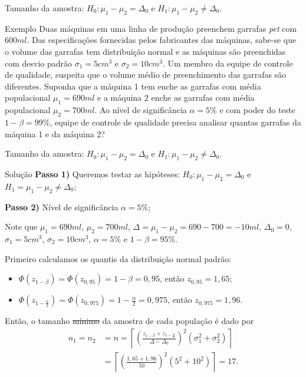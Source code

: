 \documentclass[9pt]{beamer}
\begin{document}
\begin{frame}{Tamanho da amostra: $H_0:\mu_1 - \mu_2 = \Delta_0$ e $H_1: \mu_1 - \mu_2 \neq \Delta_0$.}

\begin{block}{Exemplo}
	Duas máquinas em uma linha de produção preenchem garrafas \textit{pet} com $600ml$. Das especificações fornecidas pelos fabricantes das máquinas, sabe-se que o volume das garrafas tem distribuição normal e as máquinas são preenchidas com desvio padrão $\sigma_1=5cm^3$ e $\sigma_2=10cm^3$. Um membro da equipe de controle de qualidade, suspeita que o volume médio de preenchimento das garrafas são diferentes. Suponha que a máquina 1 tem enche as garrafas com média populacional $\mu_1=690ml$ e a máquina 2 enche as garrafas com média populacional $\mu_2=700ml$. Ao nível de significância $\alpha=5\%$ e com poder do teste $1-\beta=99\%$, equipe de controle de qualidade precisa analisar quantas garrafas da máquina 1 e da máquina 2?	
\end{block}
\end{frame}

\begin{frame}{Tamanho da amostra: $H_0:\mu_1 - \mu_2 = \Delta_0$ e $H_1: \mu_1 - \mu_2 \neq \Delta_0$.}

\normalsize

\begin{block}{Solução}
	\textbf{Passo 1)} Queremos testar as hipóteses: $H_0: \mu_1 - \mu_2 = \Delta_0$ e $H_1= \mu_1 - \mu_2 \neq \Delta_0$;
	
	\textbf{Passo 2)} Nível de significância $\alpha=5\%$;
	
	Note que $\mu_1=690ml$, $\mu_2=700ml$, $\Delta=\mu_1-\mu_2=690-700=-10ml$, $\Delta_0=0$, $\sigma_1=5cm^3$, $\sigma_2 = 10cm^3$, $\alpha = 5\%$ e $1-\beta=95\%$. 
	
	Primeiro calculamos os quantis da distribuição normal padrão:
	\begin{itemize}
		\item $\Phi\left(z_{1-\beta}\right)=\Phi\left(z_{0,95}\right) = 1-\beta=0,95$, então $z_{0,95} = 1,65$;
		\item $\Phi\left(z_{1-\frac{\alpha}{2}}\right)=\Phi\left(z_{0,975}\right) = 1-\frac{\alpha}{2}=0,975$, então $z_{0,975} = 1,96$.
	\end{itemize}

	Então, o tamanho \sout{mínimo} da amostra de cada população é dado por
	\begin{align*}
	n_1=n_2&=n=\left\lceil \left( \frac{z_{1-\beta} + z_{1-\frac{\alpha}{2}}}{ \Delta - \Delta_0 } \right)^2 (\sigma_1^2 + \sigma_2^2) \right\rceil\\
	&= \left\lceil \left( \frac{1,65 + 1,96}{50} \right)^2 (5^2 + 10^2)  \right\rceil = 17.
	\end{align*}
\end{block}

\normalsize
\end{frame}
\end{document}
